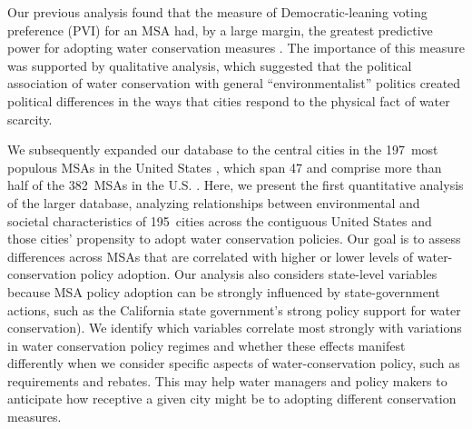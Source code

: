 \documentclass[draft,linenumbers]{agujournal}\usepackage{knitr}
\begin{document}
%
Our previous analysis found that the measure of Democratic-leaning voting preference (PVI)
for an MSA had, by a large margin,
the greatest predictive power for adopting water conservation measures
\citep{hess:drought:2016}.
The importance of this measure
was supported by qualitative analysis, which suggested that the political
association of water conservation with general ``environmentalist'' politics
created political differences in the ways that cities respond to the physical
fact of water scarcity.

We subsequently expanded our database to the central cities in the
197~most populous MSAs in
the United States \citep{hess:vwci:2017},
which span 47 and comprise more than half of the 382~MSAs
in the U.S.
\citep{census:population:2015}. Here, we present the first quantitative
analysis of the larger database, analyzing relationships between environmental
and societal characteristics of 195~cities across the contiguous
United States and those cities' propensity to adopt water conservation policies.
Our goal is to assess differences across MSAs that are correlated with higher or
lower levels of water-conservation policy adoption. Our analysis also
considers state-level
variables because MSA policy adoption can be strongly influenced by state-government actions,
such as the California state government's strong policy support for water conservation).
We identify which variables correlate most strongly with variations in water conservation policy
regimes and whether these
effects manifest differently when we consider specific aspects of
water-conservation policy, such as requirements and rebates.
This may help water managers and policy makers to anticipate how
receptive a given city might be to adopting different conservation measures.
\end{document}
